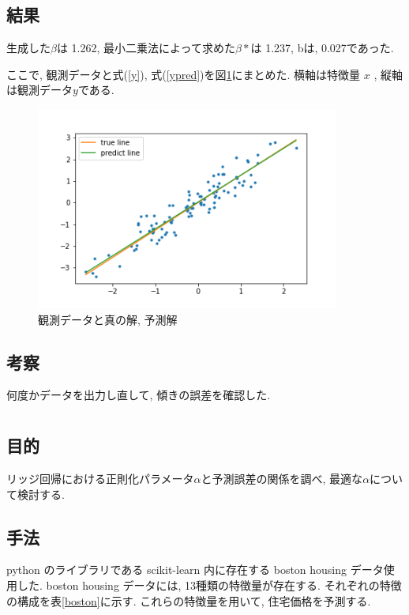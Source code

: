 \documentclass{jsarticle}
\begin{document}
\subsection{結果}
生成した$\beta$は 1.262,
最小二乗法によって求めた$\beta *$は 1.237, bは, 0.027であった. 



ここで, 観測データと式(\ref{y}), 式(\ref{ypred})を図\ref{kaku}にまとめた. 横軸は特徴量 $x$ , 縦軸は観測データ$y$である. 



\begin{figure}
\begin{center}
\label{kaku}
\caption{観測データと真の解, 予測解}
\includegraphics[width=10cm]{prog/kaku.png}
\end{center}
\end{figure}


\subsection{考察}
何度かデータを出力し直して, 傾きの誤差を確認した. 





\section{}
\subsection{目的}
リッジ回帰における正則化パラメータ$\alpha$と予測誤差の関係を調べ, 最適な$\alpha$について検討する. 

\subsection{手法}
python のライブラリである scikit-learn 内に存在する boston housing データ使用した. 
boston housing データには, 13種類の特徴量が存在する.
それぞれの特徴の構成を表\ref{boston}に示す.
これらの特徴量を用いて, 住宅価格を予測する.
\end{document}
